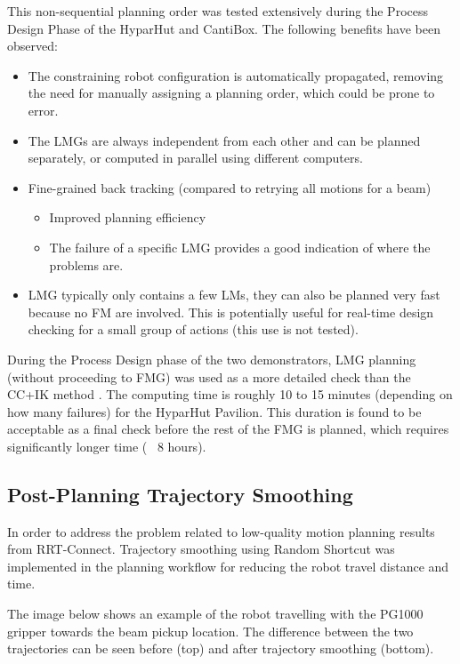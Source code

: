 This non-sequential planning order was tested extensively during the Process Design Phase of the HyparHut and CantiBox. The following benefits have been observed:
\begin{itemize}
    \item The constraining robot configuration is automatically propagated, removing the need for manually assigning a planning order, which could be prone to error.
    \item The LMGs are always independent from each other and can be planned separately, or computed in parallel using different computers.
    \item Fine-grained back tracking (compared to retrying all motions for a beam)
    \begin{itemize}
        \item Improved planning efficiency
        \item The failure of a specific LMG provides a good indication of where the problems are.
    \end{itemize}
    \item LMG typically only contains a few LMs, they can also be planned very fast because no FM are involved. This is potentially useful for real-time design checking for a small group of actions (this use is not tested).
\end{itemize}

During the Process Design phase of the two demonstrators, LMG planning (without proceeding to FMG) was used as a more detailed check than the CC+IK method . The computing time is roughly 10 to 15 minutes (depending on how many failures) for the HyparHut Pavilion. This duration is found to be acceptable as a final check before the rest of the FMG is planned, which requires significantly longer time (~ 8 hours).

\subsection{Post-Planning Trajectory Smoothing}
\label{subsection:exploration-4-post-planning-trajectory-smoothing}

In order to address the problem related to low-quality motion planning results from RRT-Connect. Trajectory smoothing using Random Shortcut \parencite{zhaoTrajectorySmoothingUsing2015} was implemented in the planning workflow for reducing the robot travel distance and time.

The image below shows an example of the robot travelling with the PG1000 gripper towards the beam pickup location. The difference between the two trajectories can be seen before (top) and after trajectory smoothing (bottom). 

